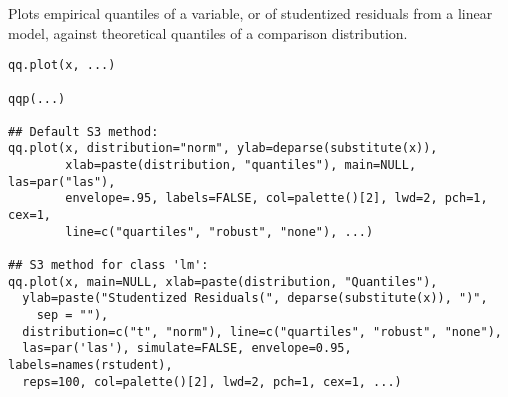 \documentclass{article}
\begin{document}
\begin{Description}\relax
Plots empirical quantiles of a variable, or of studentized residuals from
a linear model, against theoretical quantiles of a comparison distribution.
\end{Description}
\begin{Usage}
\begin{verbatim}
qq.plot(x, ...)

qqp(...)

## Default S3 method:
qq.plot(x, distribution="norm", ylab=deparse(substitute(x)),
        xlab=paste(distribution, "quantiles"), main=NULL, las=par("las"),
        envelope=.95, labels=FALSE, col=palette()[2], lwd=2, pch=1, cex=1,
        line=c("quartiles", "robust", "none"), ...)

## S3 method for class 'lm':
qq.plot(x, main=NULL, xlab=paste(distribution, "Quantiles"), 
  ylab=paste("Studentized Residuals(", deparse(substitute(x)), ")",
    sep = ""), 
  distribution=c("t", "norm"), line=c("quartiles", "robust", "none"), 
  las=par('las'), simulate=FALSE, envelope=0.95, labels=names(rstudent), 
  reps=100, col=palette()[2], lwd=2, pch=1, cex=1, ...)
\end{verbatim}
\end{Usage}
\end{document}
